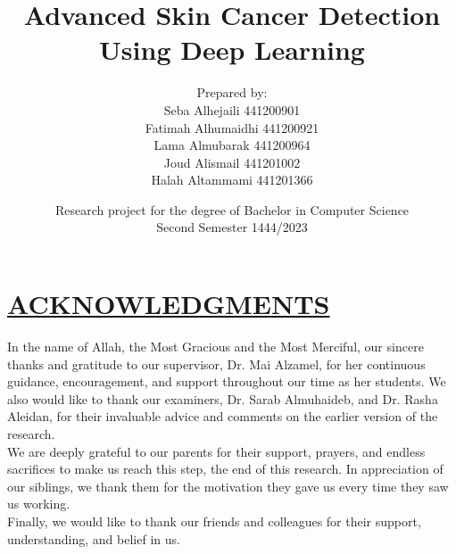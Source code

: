 \documentclass[12pt]{diazessay}
\title{Advanced Skin Cancer Detection Using Deep Learning}
\author{Prepared by: \\ 
    Seba Alhejaili \hspace{57pt} 441200901\\
    Fatimah Alhumaidhi \hspace{11pt}  441200921\\
    Lama Almubarak \hspace{33pt}  441200964\\
    Joud Alismail \hspace{57pt}  441201002\\
    Halah Altammami \hspace{25pt}  441201366\\
}
\date{Research project for the degree of Bachelor in Computer Science \\
Second Semester 1444/2023}
\begin{document}
    \cleardoublepage
    \thispagestyle{empty}
    \maketitle 

    \newpage

    \section*{\centering  \underline{ACKNOWLEDGMENTS}}
    \hspace{0.7cm} In the name of Allah, the Most Gracious and the Most Merciful, %
    our sincere thanks and gratitude to our supervisor, Dr. Mai Alzamel, for her continuous guidance, encouragement, and support throughout our time as her students. We also would like to thank our examiners, Dr. Sarab Almuhaideb, and Dr. Rasha Aleidan, for their invaluable advice and comments on the earlier version of the research. \\

     We are deeply grateful to our parents for their support, prayers, and endless sacrifices to make us reach this step, the end of this research. In appreciation of our siblings, we thank them for the motivation they gave us every time they saw us working. \\

     Finally, we would like to thank our friends and colleagues for their support, understanding, and belief in us.


     \newpage
\end{document}

